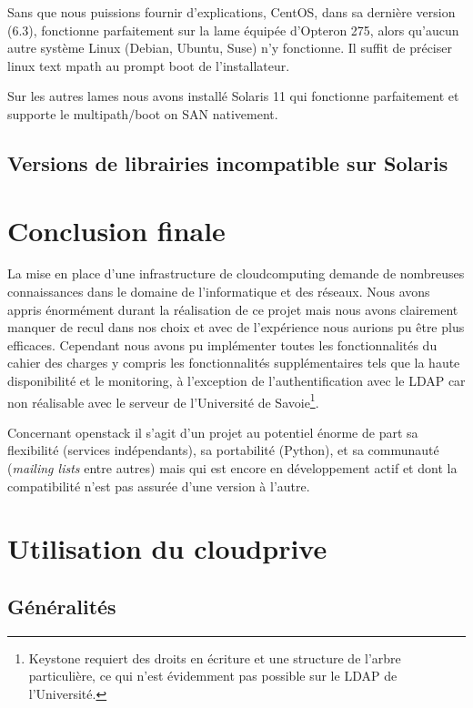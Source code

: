 \documentclass[a4paper,oneside]{report}
\begin{document}
Sans que nous puissions fournir d'explications, CentOS, dans sa dernière version (6.3), fonctionne parfaitement sur la lame équipée d'Opteron 275, alors qu'aucun autre système Linux (Debian, Ubuntu, Suse) n'y fonctionne.
Il suffit de préciser linux text mpath au prompt boot de l'installateur.

Sur les autres lames nous avons installé Solaris 11 qui fonctionne parfaitement et supporte le multipath/boot on SAN nativement.

\section{Versions de librairies incompatible sur Solaris}
\label{sec:libsolaris}

\chapter{Conclusion finale}
La mise en place d'une infrastructure de \gls{cloudcomputing} demande de nombreuses connaissances dans le domaine de l'informatique et des réseaux.
Nous avons appris énormément durant la réalisation de ce projet mais nous avons clairement manquer de recul dans nos choix et avec de l'expérience nous aurions pu être plus efficaces.\newline
Cependant nous avons pu implémenter toutes les fonctionnalités du cahier des charges y compris les fonctionnalités supplémentaires tels que la haute disponibilité et le monitoring, à l'exception de l'authentification avec le LDAP car non réalisable avec le serveur de l'Université de Savoie\footnote{Keystone requiert des droits en écriture et une structure de l'arbre particulière, ce qui n'est évidemment pas possible sur le LDAP de l'Université.}.

Concernant \gls{openstack} il s'agit d'un projet au potentiel énorme de part sa flexibilité (services indépendants), sa portabilité (Python), et sa communauté (\emph{mailing lists} entre autres) mais qui est encore en développement actif et dont la compatibilité n'est pas assurée d'une version à l'autre.




\appendix
\chapter{Utilisation du \gls{cloudprive}}
\section{Généralités}
\end{document}
